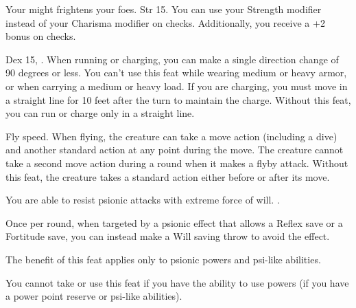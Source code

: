 {Your might frightens your foes.}
{Str 15.}
{You can use your Strength modifier instead of your Charisma modifier on  checks. Additionally, you receive a +2 bonus on  checks.}{}{}

{}
{Dex 15, .}
{When running or charging, you can make a single direction change of 90 degrees or less. You can't use this feat while wearing medium or heavy armor, or when carrying a medium or heavy load. If you are charging, you must move in a straight line for 10 feet after the turn to maintain the charge.}
{Without this feat, you can run or charge only in a straight line.}{}

{}
{Fly speed.}
{When flying, the creature can take a move action (including a dive) and another standard action at any point during the move. The creature cannot take a second move action during a round when it makes a flyby attack.}
{Without this feat, the creature takes a standard action either before or after its move.}
{}

{You are able to resist psionic attacks with extreme force of will.}
{.}
{Once per round, when targeted by a psionic effect that allows a Reflex save or a Fortitude save, you can instead make a Will saving throw to avoid the effect.

The benefit of this feat applies only to psionic powers and psi-like abilities. %
}{}
{You cannot take or use this feat if you have the ability to use powers (if you have a power point reserve or psi-like abilities).}



